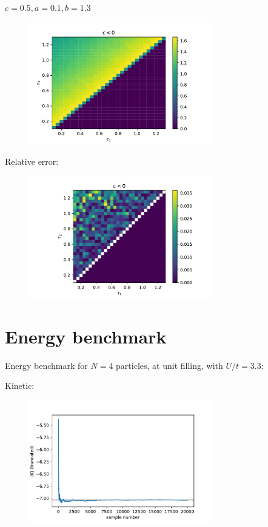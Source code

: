 \documentclass[12pt, two sided]{article}
\begin{document}
$ c=0.5 , a = 0.1, b = 1.3 $

\begin{figure}[h!]
\includegraphics[width=8cm]{../figures/0.100000_1.300000_-0.500000_sampled.pdf}
\end{figure}

Relative error:

\begin{figure}[h!]
\includegraphics[width=8cm]{../figures/0.100000_1.300000_-0.500000_relativeError_masked.pdf}
\end{figure}


\section{Energy benchmark}

Energy benchmark for $N=4$ particles, at unit filling, with $U/t=3.3$:

Kinetic:
\begin{figure}[h!]
\includegraphics[width=8cm]{../figures/runningAve_K_truncated.pdf}
\end{figure}
\end{document}
